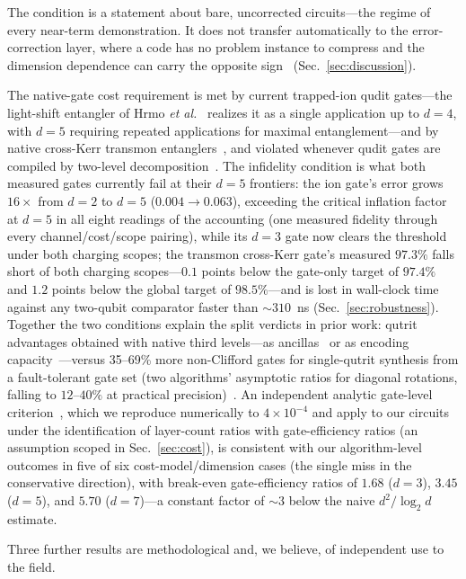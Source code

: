 \documentclass[aps,pra,reprint,superscriptaddress,nofootinbib,floatfix]{revtex4-2}
\begin{document}
The condition is a statement about bare, uncorrected circuits---the
regime of every near-term demonstration. It does not transfer
automatically to the error-correction layer, where a code has no
problem instance to compress and the dimension dependence can carry
the opposite sign~\cite{keppens2025} (Sec.~\ref{sec:discussion}).

The native-gate cost requirement is met by current trapped-ion qudit
gates---the light-shift entangler of Hrmo \emph{et
al.}~\cite{hrmo2023} realizes it as a single application up to $d=4$,
with $d=5$ requiring repeated applications for maximal
entanglement---and by native
cross-Kerr transmon entanglers~\cite{goss2022}, and violated whenever
qudit gates are compiled by two-level
decomposition~\cite{pavlidis2021,gustafson2025synthesis}. The
infidelity condition is what both measured gates currently fail at
their $d=5$ frontiers: the ion gate's error grows $16\times$
from $d=2$ to $d=5$
($0.004\to0.063$), exceeding
the critical inflation factor at $d=5$ in all eight readings of the
accounting (one measured fidelity through every channel/cost/scope
pairing), while its $d=3$ gate now clears the threshold under both
charging scopes; the transmon cross-Kerr gate's measured $97.3\%$ falls
short of both charging scopes---$0.1$ points below the gate-only
target of $97.4\%$ and $1.2$ points below the global target of
$98.5\%$---and is
lost in wall-clock time against any
two-qubit comparator faster than ${\sim}310$~ns
(Sec.~\ref{sec:robustness}).
Together the two conditions explain
the split verdicts in prior work: qutrit advantages obtained with
native third levels---as ancillas~\cite{gokhale2019} or as encoding
capacity~\cite{gustafson2022}---versus 35--69\%
more non-Clifford gates for single-qutrit synthesis from a fault-tolerant
gate set (two algorithms' asymptotic ratios for diagonal rotations,
falling to $12$--$40\%$ at practical
precision)~\cite{gustafson2025synthesis}. An independent analytic gate-level
criterion~\cite{jankovic2024}, which we reproduce numerically to
$4\times10^{-4}$ and apply to our circuits under the identification
of layer-count ratios with gate-efficiency ratios (an assumption
scoped in Sec.~\ref{sec:cost}), is consistent with our
algorithm-level outcomes in five of six cost-model/dimension cases
(the single miss in the conservative direction), with break-even
gate-efficiency ratios of $1.68$ ($d=3$), $3.45$ ($d=5$), and $5.70$
($d=7$)---a constant factor of ${\sim}3$ below the naive
$d^2/\log_2 d$ estimate.

Three further results are methodological and, we believe, of independent
use to the field.
\end{document}
